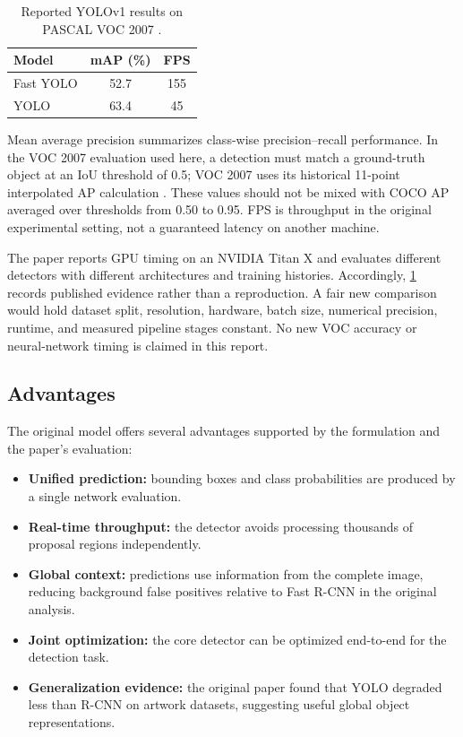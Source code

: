 \documentclass[11pt,a4paper]{article}
\begin{document}
\begin{table}[!htbp]
  \centering
  \caption{Reported YOLOv1 results on PASCAL VOC 2007 \cite{redmon2016yolo}.}
  \label{tab:results}
  \begin{tabular}{@{}lcc@{}}
    \toprule
    Model & mAP (\%) & FPS \\
    \midrule
    Fast YOLO & 52.7 & 155 \\
    YOLO & 63.4 & 45 \\
    \bottomrule
  \end{tabular}
\end{table}

Mean average precision summarizes class-wise precision--recall performance. In the VOC 2007 evaluation used here, a detection must match a ground-truth object at an IoU threshold of 0.5; VOC 2007 uses its historical 11-point interpolated AP calculation \cite{everingham2010voc}. These values should not be mixed with COCO AP averaged over thresholds from 0.50 to 0.95. FPS is throughput in the original experimental setting, not a guaranteed latency on another machine.

The paper reports GPU timing on an NVIDIA Titan X and evaluates different detectors with different architectures and training histories. Accordingly, \cref{tab:results} records published evidence rather than a reproduction. A fair new comparison would hold dataset split, resolution, hardware, batch size, numerical precision, runtime, and measured pipeline stages constant. No new VOC accuracy or neural-network timing is claimed in this report.

\subsection{Advantages}
The original model offers several advantages supported by the formulation and the paper's evaluation:
\begin{itemize}
  \item \textbf{Unified prediction:} bounding boxes and class probabilities are produced by a single network evaluation.
  \item \textbf{Real-time throughput:} the detector avoids processing thousands of proposal regions independently.
  \item \textbf{Global context:} predictions use information from the complete image, reducing background false positives relative to Fast R-CNN in the original analysis.
  \item \textbf{Joint optimization:} the core detector can be optimized end-to-end for the detection task.
  \item \textbf{Generalization evidence:} the original paper found that YOLO degraded less than R-CNN on artwork datasets, suggesting useful global object representations.
\end{itemize}
\end{document}
